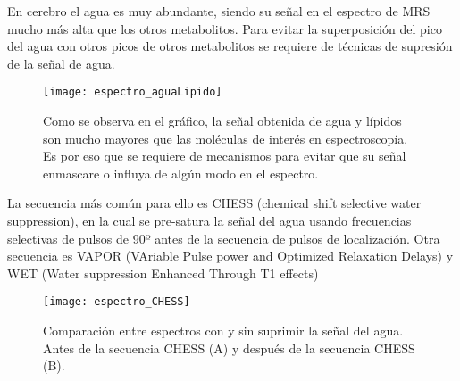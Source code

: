 En cerebro el agua es muy abundante, siendo su señal en el espectro de MRS mucho más alta que los otros metabolitos. Para evitar la superposición del pico del agua con otros picos de otros metabolitos se requiere de técnicas de supresión de la señal de agua.

\begin{figure}[htb]
 \begin{figg}
   \texttt{[image: espectro\_aguaLipido]}
   \caption{Como se observa en el gráfico, la señal obtenida de agua y lípidos son mucho mayores que las moléculas de interés en espectroscopía. Es por eso que se requiere de mecanismos para evitar que su señal enmascare o influya de algún modo en el espectro.}
 \label{fig:espectro_aguaLipido}
 \end{figg}
\end{figure}




La secuencia más común para ello es CHESS (chemical shift selective water suppression), en la cual se pre-satura la señal del agua usando frecuencias selectivas de pulsos de 90º antes de la secuencia de pulsos de localización. Otra secuencia es VAPOR (VAriable Pulse power and Optimized Relaxation Delays) y WET (Water suppression Enhanced Through T1 effects)

\begin{figure}[htb]
 \begin{figg}
   \texttt{[image: espectro\_CHESS]}
   \caption{Comparación entre espectros con y sin suprimir la señal del agua. Antes de la secuencia CHESS (A) y después de la secuencia CHESS (B).}
 \label{fig:espectro_CHESS}
 \end{figg}
\end{figure}




